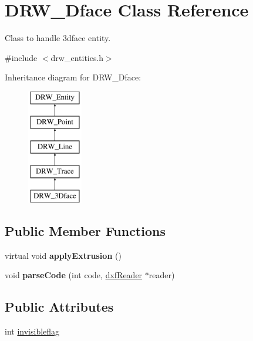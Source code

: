 \hypertarget{classDRW__3Dface}{\section{D\-R\-W\-\_\-Dface Class Reference}
\label{classDRW__3Dface}
}


Class to handle 3dface entity.  




{\ttfamily \#include $<$drw\-\_\-entities.\-h$>$}

Inheritance diagram for D\-R\-W\-\_\-Dface\-:\begin{figure}[H]
\begin{center}
\leavevmode
\includegraphics[height=5.000000cm]{classDRW__3Dface}
\end{center}
\end{figure}
\subsection*{Public Member Functions}
\begin{DoxyCompactItemize}
\item 
\hypertarget{classDRW__3Dface_ab1632466a8dc3dff5295e09b6a893229}{virtual void {\bfseries apply\-Extrusion} ()}\label{classDRW__3Dface_ab1632466a8dc3dff5295e09b6a893229}

\item 
\hypertarget{classDRW__3Dface_a841b20016d7bf6d3221aa690fb477076}{void {\bfseries parse\-Code} (int code, \hyperlink{classdxfReader}{dxf\-Reader} $\ast$reader)}\label{classDRW__3Dface_a841b20016d7bf6d3221aa690fb477076}

\end{DoxyCompactItemize}
\subsection*{Public Attributes}
\begin{DoxyCompactItemize}
\item 
int \hyperlink{classDRW__3Dface_a0fbb465670025bbd116aef1804fa5b44}{invisibleflag}
\end{DoxyCompactItemize}
